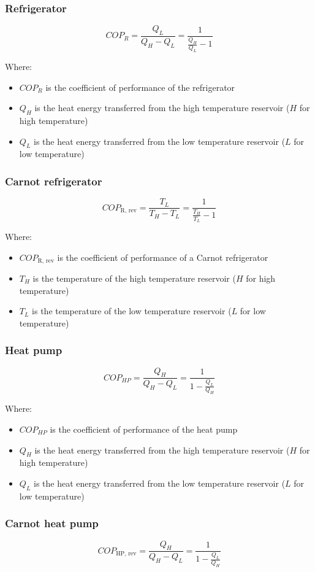 \documentclass[11pt]{article}
\begin{document}
\subsubsection{Refrigerator}
\label{sec:org8ccf6db}
\[COP_R = \frac{Q_L}{Q_H - Q_L} = \frac{1}{\frac{Q_H}{Q_L} - 1}\]

Where:
\begin{itemize}
\item \(COP_R\) is the coefficient of performance of the refrigerator
\item \(Q_{H}\) is the heat energy transferred from the high temperature reservoir (\(H\) for high temperature)
\item \(Q_{L}\) is the heat energy transferred from the low temperature reservoir (\(L\) for low temperature)
\end{itemize}
\subsubsection{Carnot refrigerator}
\label{sec:org74e8691}
\[COP_{\text{R, rev}} = \frac{T_L}{T_H - T_L} = \frac{1}{\frac{T_H}{T_L} - 1}\]

Where:
\begin{itemize}
\item \(COP_{\text{R, rev}}\) is the coefficient of performance of a Carnot refrigerator
\item \(T_{H}\) is the temperature of the high temperature reservoir (\(H\) for high temperature)
\item \(T_{L}\) is the temperature of the low temperature reservoir (\(L\) for low temperature)
\end{itemize}
\subsubsection{Heat pump}
\label{sec:org875717d}
\[COP_{HP} = \frac{Q_H}{Q_H - Q_L} = \frac{1}{1 - \frac{Q_L}{Q_H}}\]

Where:
\begin{itemize}
\item \(COP_{HP}\) is the coefficient of performance of the heat pump
\item \(Q_{H}\) is the heat energy transferred from the high temperature reservoir (\(H\) for high temperature)
\item \(Q_{L}\) is the heat energy transferred from the low temperature reservoir (\(L\) for low temperature)
\end{itemize}
\subsubsection{Carnot heat pump}
\label{sec:org10f2e41}
\[COP_{\text{HP, rev}} = \frac{Q_H}{Q_H - Q_L} = \frac{1}{1 - \frac{Q_L}{Q_H}}\]
\end{document}
